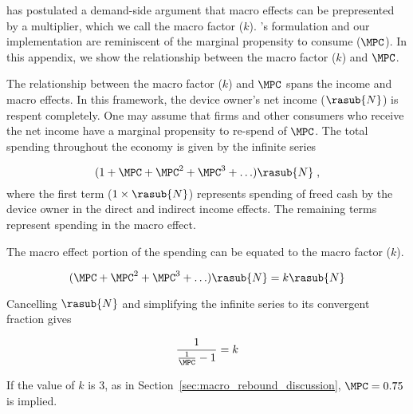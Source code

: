 
\citet{Borenstein:2015aa} has postulated a demand-side argument that macro effects 
can be prepresented by a multiplier, which we call the macro factor ($k$).
\citeauthor{Borenstein:2015aa}'s formulation and our implementation 
are reminiscent of the marginal propensity to consume ($\MPC$).
In this appendix, we show the relationship between the macro factor ($k$) and $\MPC$.

The relationship between the macro factor ($k$) and $\MPC$ spans
the income and macro effects.
In this framework, the device owner's net income ($\rasub{N}$) is respent completely.
One may assume that firms and other consumers who receive the net income have a 
marginal propensity to re-spend of $\MPC$.
The total spending throughout the economy is given by the infinite series

\begin{equation} \label{eq:infinite_series_spending}
  (1 + \MPC + \MPC^2 + \MPC^3 + \ldots) \rasub{N} \; ,
\end{equation}
%
where the first term ($1 \times \rasub{N}$) represents spending of freed cash by the device owner
in the direct and indirect income effects.
The remaining terms represent spending in the macro effect.

The macro effect portion of the spending can be equated to the macro factor ($k$).

\begin{equation} \label{eq:mpc_and_k}
  (\MPC + \MPC^2 + \MPC^3 + \ldots) \rasub{N} = k \rasub{N}
\end{equation}

Cancelling $\rasub{N}$ and simplifying the infinite series to its convergent fraction gives

\begin{equation} \label{eq:mpc_and_k_converged}
  \frac{1}{\frac{1}{\MPC} - 1} = k
\end{equation}

If the value of $k$ is 3, as in Section~\ref{sec:macro_rebound_discussion}, 
$\MPC = 0.75$ is implied.
